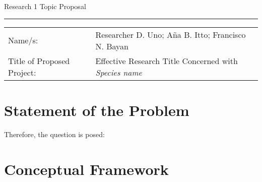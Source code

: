 \documentclass[11pt, a4paper]{article}
\begin{document}
    \hfill Research 1 Topic Proposal %
    \medskip\hrule\medskip
    \noindent %
    \begin{tabular}{@{}ll} %
        Name/s:                    & Researcher D. Uno; A\~na B. Itto; Francisco N. Bayan          \\
        Title of Proposed Project: & Effective Research Title Concerned with \textit{Species name} \\
    \end{tabular}

    \section*{Statement of the Problem}
        \blindtext 
        
        Therefore, the question is posed:  

    \section*{Conceptual Framework}
        \blindtext
        
    \printbibliography[title=Literature Cited]
\end{document}
